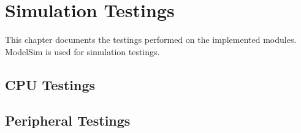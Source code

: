 \chapter{Simulation Testings}
This chapter documents the testings performed on the implemented modules. ModelSim is used for simulation testings.
\section{CPU Testings}


\newpage
\section{Peripheral Testings}



